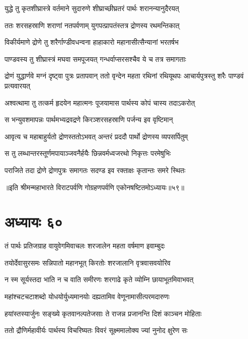 \twolineshloka
{युद्धे तु कृतशीघ्रास्त्रे वर्तमाने सुदारुणे}
{शीघ्राच्छीघ्रतरं पार्थः शरानन्यानुदैरयत्}


\twolineshloka
{ततः शरसहस्राणि शराणां नतपर्वणाम्}
{युगपत्प्रापतंस्तत्र द्रोणस्य रथमन्तिकात्}


\twolineshloka
{विकीर्यमाणे द्रोणे तु शरैर्गाण्डीवधन्वना}
{हाहाकारो महानासीत्सैन्यानां भरतर्षभ}


\twolineshloka
{पाण्डवस्य तु शीघ्रास्त्रं मघवा समपूजयत्}
{गन्धर्वाप्सरसश्चैव ये च तत्र समागताः}


\threelineshloka
{द्रोणं युद्धार्णवे मग्नं दृष्ट्वा पुत्रः प्रतापवान्}
{ततो वृन्देन महता रथिनां रथियूथपः}
{आचार्यपुत्रस्तु शरैः पाण्डवं प्रत्यवारयत्}


\twolineshloka
{अश्वत्थामा तु तत्कर्म हृदयेन महात्मनः}
{पूजयामास पार्थस्य कोपं चास्य तदाऽकरोत्}


\twolineshloka
{स भन्युवशमापन्नः पार्थमभ्यद्रवद्रणे}
{किरञ्शरसहस्राणि पर्जन्य इव वृष्टिमान्}


\twolineshloka
{आवृत्य च महाबाहुर्यतो द्रोणस्ततोऽभवत्}
{अन्तरं प्रददौ पार्थो द्रोणस्य व्यपसर्पितुम्}


\twolineshloka
{स तु लब्धान्तरस्तूर्णमपायाञ्जवनैर्हयैः}
{छिन्नवर्मध्वजरथो निकृत्तः परमेषुभिः}


\twolineshloka
{पराजिते तदा द्रोणे द्रोणपुत्रः समागतः}
{सदण्ड इव रक्ताक्षः कृतान्तः समरे स्थितः}

॥इति श्रीमन्महाभारते विराटपर्वणि गोग्रहणपर्वणि एकोनषष्टितमोऽध्यायः॥५९॥

\chapter{अध्यायः ६०}

\twolineshloka
{तं पार्थः प्रतिजग्राह वायुवेगमिवाचलः}
{शरजालेन महता वर्षमाण इवाम्बुदः}


\twolineshloka
{तयोर्देवासुरसमः सन्निपातो महानभूत्}
{किरतोः शरजालानि वृत्रवासवयोरिव}


\twolineshloka
{न स्म सूर्यस्तदा भाति न च वाति समीरणः}
{शरगाढे कृते व्योम्नि छायाभूतमिवाभवत्}


\twolineshloka
{महांश्चटचटाशब्दो योधयोर्युध्यमानयोः}
{दह्यतामिव वेणूनामासीत्परमदारुणः}


\twolineshloka
{हयांस्तस्यार्जुनः सङ्ख्ये कृतवानल्पतेजसाः}
{ते राजन्न प्रजानन्ति दिशं काञ्चन मोहिताः}


\twolineshloka
{ततो द्रौणिर्महावीर्यः पार्थस्य विचरिष्यतः}
{विवरं सूक्ष्ममालोक्य ज्यां नुनोद क्षुरेण सः}


